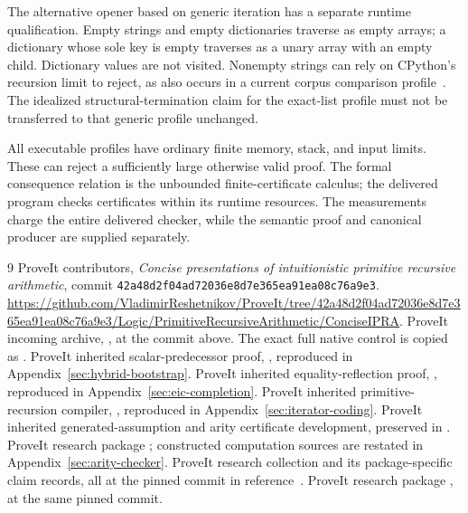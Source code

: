\documentclass[11pt,letterpaper]{article}
\theoremstyle{definition}
\theoremstyle{remark}
\begin{document}
The alternative opener based on generic iteration has a separate
runtime qualification.  Empty strings and empty dictionaries traverse
as empty arrays; a dictionary whose sole key is empty traverses as a
unary array with an empty child.  Dictionary values are not visited.
Nonempty strings can rely on CPython's recursion limit to reject, as
also occurs in a current corpus comparison profile~\cite{transient}.
The idealized structural-termination claim for the exact-list profile
must not be transferred to that generic profile unchanged.

All executable profiles have ordinary finite memory, stack, and input
limits.  These can reject a sufficiently large otherwise valid proof.
The formal consequence relation is the unbounded finite-certificate
calculus; the delivered program checks certificates within its runtime
resources.  The measurements charge the entire delivered checker,
while the semantic proof and canonical producer are supplied separately.


\clearpage
\begin{thebibliography}{9}
 ProveIt contributors, \emph{Concise presentations of
intuitionistic primitive recursive arithmetic}, commit
\texttt{42a48d2f04ad72036e8d7e365ea91ea08c76a9e3}.
\url{https://github.com/VladimirReshetnikov/ProveIt/tree/42a48d2f04ad72036e8d7e365ea91ea08c76a9e3/Logic/PrimitiveRecursiveArithmetic/ConciseIPRA}.
 ProveIt incoming archive,
, at the commit above.
The exact full native control is copied as
.
 ProveIt inherited scalar-predecessor proof,
,
reproduced in Appendix~\ref{sec:hybrid-bootstrap}.
 ProveIt inherited equality-reflection proof,
,
reproduced in Appendix~\ref{sec:eic-completion}.
 ProveIt inherited primitive-recursion compiler,
,
reproduced in Appendix~\ref{sec:iterator-coding}.
 ProveIt inherited generated-assumption and arity
certificate development, preserved in
.
 ProveIt research package
; constructed computation sources
are restated in Appendix~\ref{sec:arity-checker}.
 ProveIt research collection and its package-specific
claim records, all at the pinned commit in reference~\cite{repo}.
 ProveIt research package ,
at the same pinned commit.
\end{thebibliography}
\end{document}
